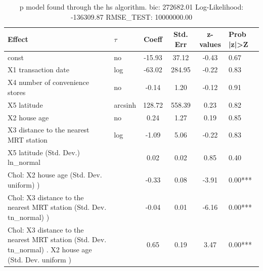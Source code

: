 \begin{table}
	\caption{p model found through the hs algorithm. bic: 272682.01 Log-Likelihood: -136309.87 RMSE_TEST: 10000000.00}
	\begin{center}
		\begin{tabular}{|l|l|c|c|c|l|}
			\hline
			Effect & $\tau$ & Coeff & Std. Err & z-values & Prob |z|>Z \\
			\hline
			const & no & -15.93 & 37.12 & -0.43 & 0.67 \\
			\hline
			X1 transaction date & log & -63.02 & 284.95 & -0.22 & 0.83 \\
			\hline
			X4 number of convenience stores & no & -0.14 & 1.20 & -0.12 & 0.91 \\
			\hline
			X5 latitude & arcsinh & 128.72 & 558.39 & 0.23 & 0.82 \\
			\hline
			X2 house age & no & 0.24 & 1.27 & 0.19 & 0.85 \\
			\hline
			X3 distance to the nearest MRT station & log & -1.09 & 5.06 & -0.22 & 0.83 \\
			\hline
			X5 latitude (Std. Dev.) ln_normal &  & 0.02 & 0.02 & 0.85 & 0.40 \\
			\hline
			 Chol: X2 house age (Std. Dev. uniform) ) &  & -0.33 & 0.08 & -3.91 & 0.00*** \\
			\hline
			 Chol: X3 distance to the nearest MRT station (Std. Dev. tn_normal) ) &  & -0.04 & 0.01 & -6.16 & 0.00*** \\
			\hline
			 Chol: X3 distance to the nearest MRT station (Std. Dev. tn_normal) . X2 house age (Std. Dev.   uniform ) &  & 0.65 & 0.19 & 3.47 & 0.00*** \\
			\hline
		\end{tabular}
	\end{center}
\end{table}